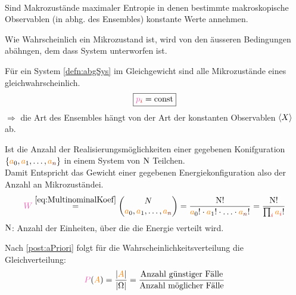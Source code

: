 \begin{defnbox}\nospacing
  \begin{defn}\leavevmode \\
    Sind Makrozustände maximaler Entropie in denen bestimmte makroskopische Observablen (in abhg. des Ensembles) konstante Werte annehmen.
  \end{defn}
\end{defnbox}
\begin{notebox}[Bemerkung]
  Wie Wahrscheinlich ein Mikrozustand ist, wird von den äusseren Bedingungen abähngen, dem dass System unterworfen ist.
\end{notebox}
\begin{postbox}\nospacing
  \begin{post}\label{post:aPriori}
    Für ein  System \cref{defn:abgSys} im Gleichgewicht sind alle Mikrozustände eines
     gleichwahrscheinlich.
    \begin{align*}
      \boxed{\pb_{\idxi}=\text{const}}
    \end{align*}
    $\Rightarrow$ die Art des Ensembles hängt von der Art der konstanten Observablen $\left\langle X\right\rangle$ ab.
  \end{post}
\end{postbox}
\begin{defnbox}\nospacing
  \begin{defn}[Gewicht]\label{defn:Gewicht}\nospacing
    Ist die Anzahl der Realisierungsmöglichkeiten einer gegebenen Konifguration $\{\mca_0,\mca_1,\ldots,\mca_{\idxn}\}$ in einem System von $\mathrm{N}$ Teilchen.\\
    Damit Entspricht das Gewicht einer gegebenen Energiekonfiguration also der Anzahl an Mikrozuständei.
    \begin{align}
      \Wg\eqs{\cref{eq:MultinominalKoef}}\vect{N \\ \mca_0,\mca_1,\ldots,\mca_{\idxn}}=\frac{\Nz!}{\mca_0!\cdot\mca_1!\cdot\ldots\cdot\mca_{\idxn}!}=\frac{\Nz!}{\prod_{\idxi}\mca_{\idxi}!}
    \end{align}
    $\mathrm{N}$: Anzahl der Einheiten, über die die Energie verteilt wird.
  \end{defn}
\end{defnbox}
\begin{corbox}\nospacing
  \begin{cor}\label{cor:Gleichverteilung}
   Nach \cref{post:aPriori} folgt für die Wahrscheinlichkeitsverteilung die Gleichverteilung:
   \begin{align}
     \Pb(\mca[A])=\frac{\abs{\mca[A]}}{\abs{\Omega}}=\frac{\text{Anzahl günstiger Fälle}}{\text{Anzahl möglicher Fälle}}
   \end{align}
  \end{cor}  
\end{corbox}
